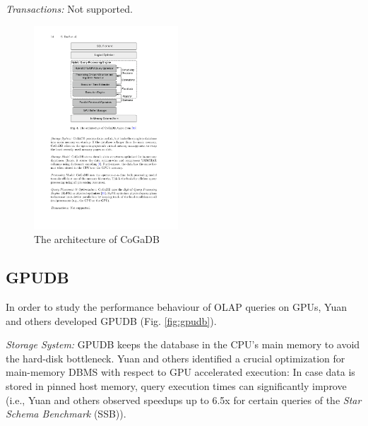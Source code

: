 \documentclass[twocolumn]{article}
\begin{document}
\noindent
\textit{Transactions:} Not supported.
\begin{figure}[htb]
        \centering
        \includegraphics[width=0.48\textwidth]{cogadb.pdf}
        \caption{The architecture of CoGaDB}
        \label{fig:cogadb}
\end{figure}

\subsection{GPUDB}
In order to study the performance behaviour of OLAP queries on GPUs, Yuan and others developed GPUDB (Fig. \ref{fig:gpudb}).

\noindent
\textit{Storage System:} 
GPUDB keeps the database in the CPU’s main memory to avoid the hard-disk bottleneck. Yuan and others identified a crucial optimization for main-memory DBMS with respect to GPU accelerated execution: In case data is stored in pinned host memory, query execution times can significantly improve (i.e., Yuan and others observed speedups up to 6.5x for certain queries of the \textit{Star Schema Benchmark} (SSB)).
\end{document}
